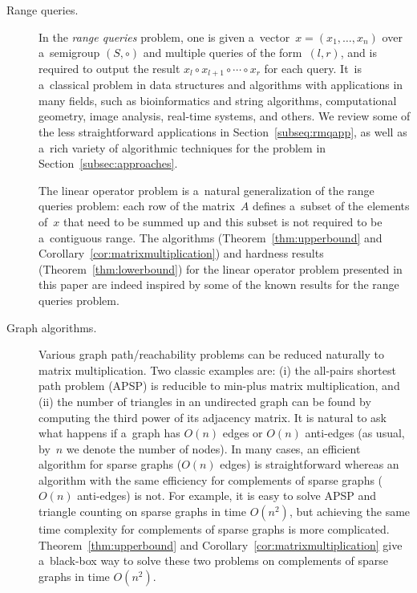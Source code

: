 \documentclass[a4paper,UKenglish,cleveref, autoref]{lipics-v2019}
\begin{document}
\begin{description}
\item[Range queries.] In the \emph{range queries} problem,
one is given a~vector~$x=(x_1, \dotsc, x_n)$ over a~semigroup $(S, \circ)$ and
multiple queries of the form~$(l,r)$, and is required to
output the result $x_l \circ x_{l+1} \circ \dotsb \circ x_r$
for each query. It~is a~classical problem in data structures and
algorithms with applications in many fields, such as bioinformatics and
string algorithms, computational geometry, image analysis, real-time
systems, and others. We review some of the less straightforward applications in Section~\ref{subseq:rmqapp},
as well as a~rich variety of algorithmic techniques for the problem in
Section~\ref{subsec:approaches}.

The linear operator problem is a~natural generalization of the range queries
problem: each row of the matrix~$A$ defines a~subset of the elements of~$x$
that need to be summed up and this subset is not required to be
a~contiguous range. The algorithms (Theorem~\ref{thm:upperbound} and
Corollary~\ref{cor:matrixmultiplication}) and hardness results
(Theorem~\ref{thm:lowerbound}) for the linear operator problem presented in this
paper are indeed inspired by some of the known results for the range queries
problem.

\item[Graph algorithms.] Various graph path/reachability
problems can be reduced naturally to matrix multiplication.
Two classic examples are: (i) the all-pairs shortest path problem (APSP) is
reducible to min-plus matrix multiplication, and (ii) the number of triangles
in an undirected graph can be found by computing the third power of its
adjacency matrix.
It is natural to ask what happens if
a~graph has $O(n)$ edges or $O(n)$ anti-edges
(as usual, by~$n$ we denote the number of nodes).
In many cases, an efficient algorithm
for sparse graphs ($O(n)$ edges) is straightforward
whereas an algorithm with the same efficiency
for complements of sparse graphs ($O(n)$ anti-edges) is not. For
example, it is easy to solve APSP and triangle counting on sparse graphs in
time $O(n^2)$, but achieving the same time complexity for complements of sparse
graphs is more complicated.
Theorem~\ref{thm:upperbound} and Corollary~\ref{cor:matrixmultiplication} give a~black-box way to solve these two problems on complements of sparse graphs in time $O(n^2)$.


\end{description}
\end{document}
